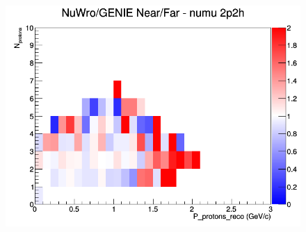 \documentclass[12pt]{article}
\begin{document}
\begin{figure}[h]
\endminipage
{}
\includegraphics[width=\linewidth]{eff_N_P/LAr/protons/ratios/2p2h_NuWro_GENIE_numu_NF_N_P.png}
\endminipage
\newline
\end{figure}
\clearpage
\end{document}
